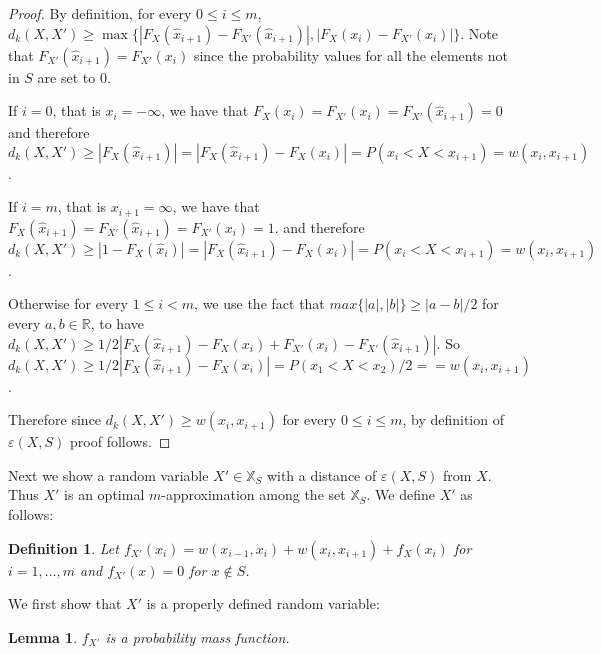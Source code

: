 \documentclass{article}
\newtheorem{lemma}[thm]{Lemma}
\newtheorem{definition}[thm]{Definition}
\begin{document}
\begin{proof}
	
	
	By definition, for every $0\leq i\leq m$, $d_k(X,X') \geq \max \{|F_X(\hat x_{i+1}) - F_{X'}(\hat x_{i+1})|,|F_X(x_i) - F_{X'}(x_i)| \}$. Note that $F_{X'}(\hat x_{i+1})=F_{X'}(x_i)$ since the probability values for all the elements not in $S$ are set to $0$.
	
	If $i=0$, that is $x_i=-\infty$, we have that $F_X(x_i)=F_{X'}(x_i)=F_{X'}(\hat x_{i+1})=0$ and therefore $d_k(X,X') \geq |F_X(\hat x_{i+1})| = |F_X(\hat x_{i+1}) - F_{X}(x_i)| =  P(x_i < X < x_{i+1})= w(x_i,x_{i+1})$.
	
	If $i =m$, that is $x_{i+1}=\infty$, we have that $F_X(\hat x_{i+1})=F_{X'}(\hat x_{i+1})=F_{X'}(x_i)=1$. 
	and therefore $d_k(X,X') \geq |1-F_X(\hat x_i)| = |F_X(\hat x_{i+1}) - F_{X}(x_i)| =  P(x_i < X < x_{i+1}) = w(x_i,x_{i+1})$. 
	
	
	Otherwise for every $1\leq i< m$,  we use the fact that $max\{|a|,|b|\} \geq |a-b|/2$ for every $a,b\in\mathbb{R}$, to have $d_k(X,X') \geq 1/2| F_X(\hat x_{i+1}) - F_X(x_i) + F_{X'}(x_i) -F_{X'}(\hat x_{i+1})|$. So $d_k(X,X') \geq 1/2| F_X(\hat x_{i+1}) - F_X(x_i) | =P(x_1 < X < x_2)/2 == w(x_i,x_{i+1})$. 
	
	Therefore since $d_k(X,X') \geq  w(x_i,x_{i+1})$ for every $0\leq i\leq m$, by definition of $\varepsilon(X,S)$ proof follows.
\end{proof}



Next we show a random variable $X'\in\mathbb{X}_S$ with a distance of $\varepsilon(X,S)$ from $X$. Thus $X'$ is an optimal $m$-approximation among the set $\mathbb{X}_S$. We define $X'$ as follows:

\begin{definition}\label{def:construction}
	Let $f_{X'}(x_{i}) = w(x_{i-1},x_i) + w(x_i,x_{i+1}) + f_{X}(x_i)$ for $i=1,\dots,m$ and $f_{X'}(x)=0$ for $x \notin S$.
\end{definition}

We first show that $X'$ is a properly defined random variable:

\begin{lemma}
	$f_{X'}$ is a probability mass function. 
\end{lemma}
\end{document}
